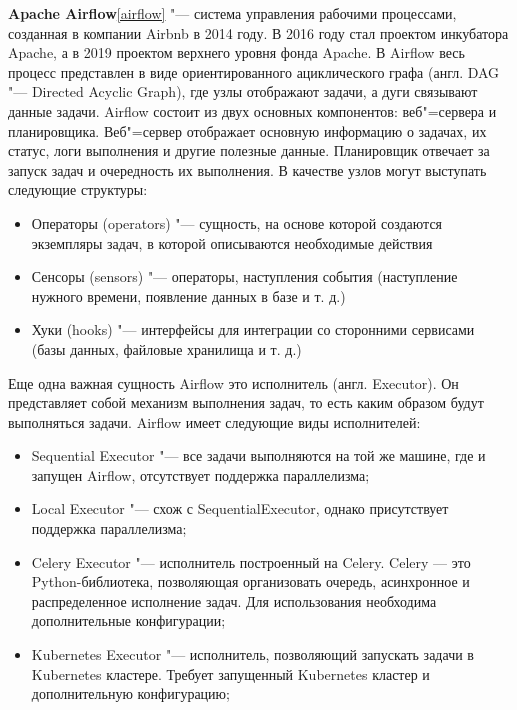 \documentclass[bachelor, och, pract]{SCWorks}
\begin{document}
\textbf{Apache Airflow}\ref{airflow} "--- система управления рабочими процессами, созданная в компании Airbnb в 2014 году. В 2016 году стал проектом инкубатора Apache, а в 2019 проектом верхнего уровня фонда Apache. В Airflow весь процесс представлен в виде ориентированного ациклического графа (англ. DAG "--- Directed Acyclic Graph), где узлы отображают задачи, а дуги связывают данные задачи. Airflow состоит из двух основных компонентов: веб"=сервера и планировщика. Веб"=сервер отображает основную информацию о задачах, их статус, логи выполнения и другие полезные данные. Планировщик отвечает за запуск задач и очередность их выполнения.  В качестве узлов могут выступать следующие структуры:
\begin{itemize}
	\item Операторы (operators) "--- сущность, на основе которой создаются экземпляры задач, в которой описываются необходимые действия
	\item Сенсоры (sensors) "--- операторы, наступления события (наступление нужного времени, появление данных в базе и т. д.)
	\item Хуки (hooks) "--- интерфейсы для интеграции со сторонними сервисами (базы данных, файловые хранилища и т. д.)
\end{itemize}

Еще одна важная сущность Airflow это исполнитель (англ. Executor). Он представляет собой механизм выполнения задач, то есть каким образом будут выполняться задачи. Airflow имеет следующие виды исполнителей:

\begin{itemize}
	\item Sequential Executor "--- все задачи выполняются на той же машине, где и запущен Airflow, отсутствует поддержка параллелизма;
	\item Local Executor "--- схож с SequentialExecutor, однако присутствует поддержка параллелизма;
	\item Celery Executor "--- исполнитель построенный на Celery. Celery — это Python-библиотека, позволяющая организовать очередь, асинхронное и распределенное исполнение задач. Для использования необходима дополнительные конфигурации;
	\item Kubernetes Executor "--- исполнитель, позволяющий запускать задачи в Kubernetes кластере. Требует запущенный Kubernetes кластер и дополнительную конфигурацию;
\end{itemize}
\end{document}
